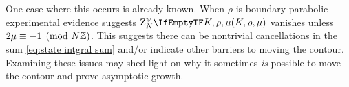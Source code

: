 \documentclass[margincite, leqno]{sl2art}
\numberwithin{equation}{section}
\begin{document}
One case where this occurs is already known.
When \(\rho\) is boundary-parabolic experimental evidence
\cite[Remark 6.2]{McPhailSnyderVolume} suggests \(\qinv{K, \rho,
\mu}\) vanishes unless  \(2\mu \equiv -1 \pmod {N \mathbb{Z}}\).
This suggests there can be nontrivial cancellations in the sum
\eqref{eq:state intgral sum} and/or indicate other barriers to moving
the contour.
Examining these issues may shed light on why it sometimes \emph{is}
possible to move the contour and prove asymptotic growth.

\printbibliography
\end{document}
